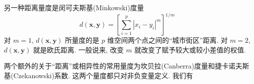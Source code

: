 另一种距离量度是闵可夫斯基(Minkowski)度量
\label{eq:12-3}
\begin{equation}
d(\mathbf{x},\mathbf{y})=\left[\sum_{i=1}^{p}|x_i-y_i|^{m}\right]^{1/m}
\tag{12-3}
\end{equation}
对 $m=1$, $d(\mathbf{x},\mathbf{y})$ 所量度的是 $p$ 维空间两个点之间的“城市街区”距离. 对 $m=2$, $d(\mathbf{x},\mathbf{y})$ 就是欧氏距离. 一般说来, 改变 $m$ 就改变了赋予较大或较小差值的权值.

两个额外的关于“距离”或相异性的常用量度为坎贝拉(Canberra)度量和捷卡诺夫斯基(Czekanowski)系数. 这两个量度都只对非负变量定义. 我们有
